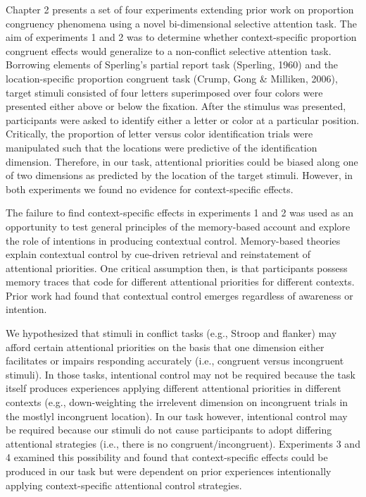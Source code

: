 \documentclass[]{DissertateCUNY}
\begin{document}
Chapter 2 presents a set of four experiments extending prior work on
proportion congruency phenomena using a novel bi-dimensional selective
attention task. The aim of experiments 1 and 2 was to determine whether
context-specific proportion congruent effects would generalize to a
non-conflict selective attention task. Borrowing elements of Sperling's
partial report task (Sperling, 1960) and the location-specific
proportion congruent task (Crump, Gong \& Milliken, 2006), target
stimuli consisted of four letters superimposed over four colors were
presented either above or below the fixation. After the stimulus was
presented, participants were asked to identify either a letter or color
at a particular position. Critically, the proportion of letter versus
color identification trials were manipulated such that the locations
were predictive of the identification dimension. Therefore, in our task,
attentional priorities could be biased along one of two dimensions as
predicted by the location of the target stimuli. However, in both
experiments we found no evidence for context-specific effects.

The failure to find context-specific effects in experiments 1 and 2 was
used as an opportunity to test general principles of the memory-based
account and explore the role of intentions in producing contextual
control. Memory-based theories explain contextual control by cue-driven
retrieval and reinstatement of attentional priorities. One critical
assumption then, is that participants possess memory traces that code
for different attentional priorities for different contexts. Prior work
had found that contextual control emerges regardless of awareness or
intention.

We hypothesized that stimuli in conflict tasks (e.g., Stroop and
flanker) may afford certain attentional priorities on the basis that one
dimension either facilitates or impairs responding accurately (i.e.,
congruent versus incongruent stimuli). In those tasks, intentional
control may not be required because the task itself produces experiences
applying different attentional priorities in different contexts (e.g.,
down-weighting the irrelevent dimension on incongruent trials in the
mostlyl incongruent location). In our task however, intentional control
may be required because our stimuli do not cause participants to adopt
differing attentional strategies (i.e., there is no
congruent/incongruent). Experiments 3 and 4 examined this possibility
and found that context-specific effects could be produced in our task
but were dependent on prior experiences intentionally applying
context-specific attentional control strategies.
\end{document}
